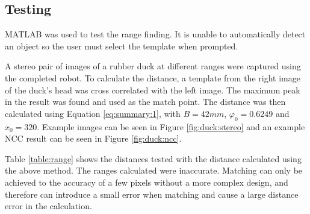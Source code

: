 \subsection{Testing}
MATLAB was used to test the range finding. It is unable to automatically detect an object so the user must select the template when prompted. 

A stereo pair of images of a rubber duck at different ranges were captured using the completed robot. To calculate the distance, a template from the right image of the duck's head was cross correlated with the left image. The maximum peak in the result was found and used as the match point. The distance was then calculated using Equation \eqref{eq:summary:1}, with $B=42mm$, $\varphi_0=0.6249$ and $x_0=320$. Example images can be seen in Figure \ref{fig:duck:stereo} and an example NCC result can be seen in Figure \ref{fig:duck:ncc}. 

Table \ref{table:range} shows the distances tested with the distance calculated using the above method. The ranges calculated were inaccurate. Matching can only be achieved to the accuracy of a few pixels without a more complex design, and therefore can introduce a small error when matching and cause a large distance error in the calculation. 

